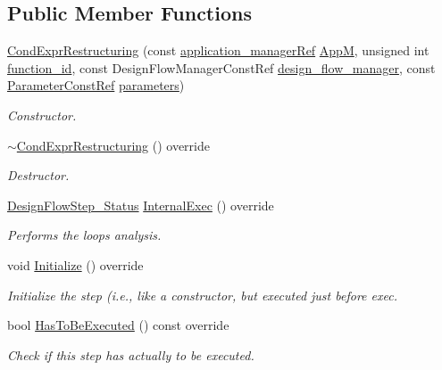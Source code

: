 \subsection*{Public Member Functions}
\begin{DoxyCompactItemize}
\item 
\hyperlink{classCondExprRestructuring_aff2acb01e9ec210d31c60d0b0479a27e}{Cond\+Expr\+Restructuring} (const \hyperlink{application__manager_8hpp_a04ccad4e5ee401e8934306672082c180}{application\+\_\+manager\+Ref} \hyperlink{classFrontendFlowStep_a0ac0d8db2a378416583f51c4faa59d15}{AppM}, unsigned int \hyperlink{classFunctionFrontendFlowStep_a58ef2383ad1a212a8d3f396625a4b616}{function\+\_\+id}, const Design\+Flow\+Manager\+Const\+Ref \hyperlink{classDesignFlowStep_ab770677ddf087613add30024e16a5554}{design\+\_\+flow\+\_\+manager}, const \hyperlink{Parameter_8hpp_a37841774a6fcb479b597fdf8955eb4ea}{Parameter\+Const\+Ref} \hyperlink{classDesignFlowStep_a802eaafe8013df706370679d1a436949}{parameters})
\begin{DoxyCompactList}\small\item\em Constructor. \end{DoxyCompactList}\item 
\hyperlink{classCondExprRestructuring_a0757aa268f6cc71b9b5966ac6ce38ab0}{$\sim$\+Cond\+Expr\+Restructuring} () override
\begin{DoxyCompactList}\small\item\em Destructor. \end{DoxyCompactList}\item 
\hyperlink{design__flow__step_8hpp_afb1f0d73069c26076b8d31dbc8ebecdf}{Design\+Flow\+Step\+\_\+\+Status} \hyperlink{classCondExprRestructuring_aae99125cadd764e66ff2566f4942ecb2}{Internal\+Exec} () override
\begin{DoxyCompactList}\small\item\em Performs the loops analysis. \end{DoxyCompactList}\item 
void \hyperlink{classCondExprRestructuring_a5ac68a27de704107d9e33b3a93751a73}{Initialize} () override
\begin{DoxyCompactList}\small\item\em Initialize the step (i.\+e., like a constructor, but executed just before exec. \end{DoxyCompactList}\item 
bool \hyperlink{classCondExprRestructuring_a4442cdaca3a1345d45f17912918f1392}{Has\+To\+Be\+Executed} () const override
\begin{DoxyCompactList}\small\item\em Check if this step has actually to be executed. \end{DoxyCompactList}\end{DoxyCompactItemize}
